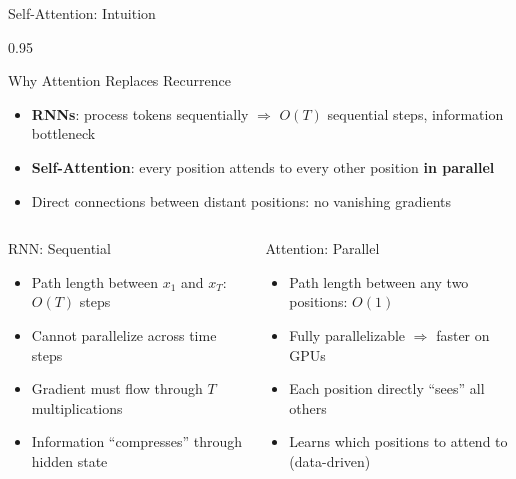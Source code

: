 \documentclass[9pt, aspectratio=169, t]{beamer}
\begin{document}
\begin{frame}{Self-Attention: Intuition}
    \begin{cminipage}{0.95\textwidth}
    \vspace{-3mm}
    \begin{block}{Why Attention Replaces Recurrence}
        {\scriptsize
        \begin{itemize}\setlength{\itemsep}{0pt}
            \item \textbf{RNNs}: process tokens sequentially $\Rightarrow$ $O(T)$ sequential steps, information bottleneck
            \item \textbf{Self-Attention}: every position attends to every other position \textbf{in parallel}
            \item Direct connections between distant positions: no vanishing gradients
        \end{itemize}
        }
    \end{block}
    \vspace{-3mm}
    \begin{columns}[T]
        \begin{alertblock}{RNN: Sequential}
            {\scriptsize
            \begin{itemize}\setlength{\itemsep}{0pt}
                \item Path length between $x_1$ and $x_T$: $O(T)$ steps
                \item Cannot parallelize across time steps
                \item Gradient must flow through $T$ multiplications
                \item Information ``compresses'' through hidden state
            \end{itemize}
            }
        \end{alertblock}

        \begin{exampleblock}{Attention: Parallel}
            {\scriptsize
            \begin{itemize}\setlength{\itemsep}{0pt}
                \item Path length between any two positions: $O(1)$
                \item Fully parallelizable $\Rightarrow$ faster on GPUs
                \item Each position directly ``sees'' all others
                \item Learns which positions to attend to (data-driven)
            \end{itemize}
            }
        \end{exampleblock}
    \end{columns}
    \end{cminipage}
\end{frame}
\end{document}

